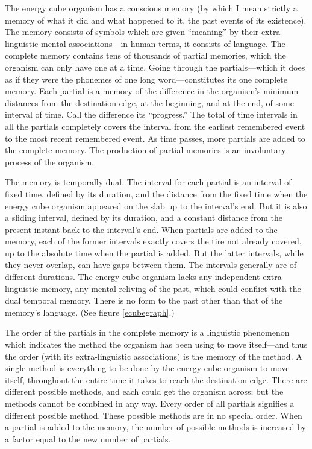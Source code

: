 The energy cube organism has a conscious memory (by which I mean 
strictly a memory of what it did and what happened to it, the past events of 
its existence). The memory consists of symbols which are given \enquote{meaning} 
by their extra-linguistic mental associations---in human terms, it consists of 
language. The complete memory contains tens of thousands of partial 
memories, which the organism can only have one at a time. Going through 
the partials---which it does as if they were the phonemes of one long 
word---constitutes its one complete memory. Each partial is a memory of the 
difference in the organism's minimum distances from the destination edge, at 
the beginning, and at the end, of some interval of time. Call the difference its 
\enquote{progress.} The total of time intervals in all the partials completely covers 
the interval from the earliest remembered event to the most recent 
remembered event. As time passes, more partials are added to the complete 
memory. The production of partial memories is an involuntary process of 
the organism. 

The memory is temporally dual. The interval for each partial is an 
interval of fixed time, defined by its duration, and the distance from the 
fixed time when the energy cube organism appeared on the slab up to the 
interval's end. But it is also a sliding interval, defined by its duration, and a 
constant distance from the present instant back to the interval's end. When 
partials are added to the memory, each of the former intervals exactly covers 
the tire not already covered, up to the absolute time when the partial is 
added. But the latter intervals, while they never overlap, can have gaps 
between them. The intervals generally are of different durations. The energy 
cube organism lacks any independent extra-linguistic memory, any mental 
reliving of the past, which could conflict with the dual temporal memory. 
There is no form to the past other than that of the memory's language. (See 
figure \ref{ecubegraph}.)

The order of the partials in the complete memory is a linguistic 
phenomenon which indicates the method the organism has been using to 
move itself---and thus the order (with its extra-linguistic associations) is the 
memory of the method. A single method is everything to be done by the 
energy cube organism to move itself, throughout the entire time it takes to 
reach the destination edge. There are different possible methods, and each 
could get the organism across; but the methods cannot be combined in any 
way. Every order of all partials signifies a different possible method. These 
possible methods are in no special order. When a partial is added to the 
memory, the number of possible methods is increased by a factor equal to 
the new number of partials. 

